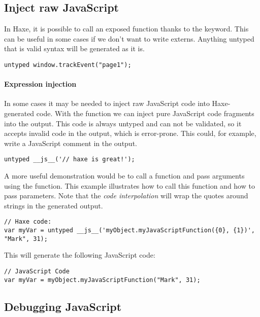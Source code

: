 \subsection{Inject raw JavaScript}
\label{target-javascript-injection}

In Haxe, it is possible to call an exposed function thanks to the  keyword. This can be useful in some cases if we don't want to write externs. Anything untyped that is valid syntax will be generated as it is.

\begin{lstlisting}
untyped window.trackEvent("page1");  
\end{lstlisting}

\paragraph{Expression injection} 

In some cases it may be needed to inject raw JavaScript code into Haxe-generated code. With the  function we can inject pure JavaScript code fragments into the output. This code is always untyped and can not be validated, so it accepts invalid code in the output, which is error-prone.
This could, for example, write a JavaScript comment in the output.

\begin{lstlisting}
untyped __js__('// haxe is great!');
\end{lstlisting}

A more useful demonstration would be to call a function and pass  arguments using the  function. This example illustrates how to call this function and how to pass parameters. Note that the \emph{code interpolation} will wrap the quotes around strings in the generated output.

\begin{lstlisting}
// Haxe code:
var myVar = untyped __js__('myObject.myJavaScriptFunction({0}, {1})', "Mark", 31);
\end{lstlisting}

This will generate the following JavaScript code:
\begin{lstlisting}
// JavaScript Code
var myVar = myObject.myJavaScriptFunction("Mark", 31);
\end{lstlisting}

\subsection{Debugging JavaScript}
\label{target-javascript-debugging}


